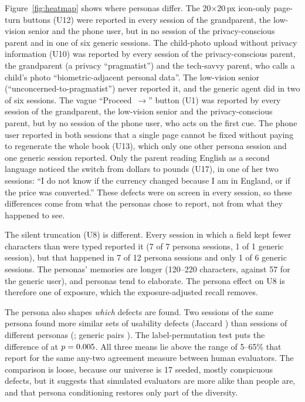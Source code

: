 \documentclass[10pt,twocolumn]{article}
\begin{document}
Figure~\ref{fig:heatmap} shows where personas differ. The 20$\times$20\,px icon-only page-turn buttons (U12) were reported in every session of the grandparent, the low-vision senior and the phone user, but in no session of the privacy-conscious parent and in one of six generic sessions. The child-photo upload without privacy information (U10) was reported by every session of the privacy-conscious parent, the grandparent (a privacy ``pragmatist'') and the tech-savvy parent, who calls a child's photo ``biometric-adjacent personal data''. The low-vision senior (``unconcerned-to-pragmatist'') never reported it, and the generic agent did in two of six sessions. The vague ``Proceed~$\to$'' button (U1) was reported by every session of the grandparent, the low-vision senior and the privacy-conscious parent, but by no session of the phone user, who acts on the first cue. The phone user reported in both sessions that a single page cannot be fixed without paying to regenerate the whole book (U13), which only one other persona session and one generic session reported. Only the parent reading English as a second language noticed the switch from dollars to pounds (U17), in one of her two sessions: ``I do not know if the currency changed because I am in England, or if the price was converted.'' These defects were on screen in every session, so these differences come from what the personas chose to report, not from what they happened to see.

The silent truncation (U8) is different. Every session in which a field kept fewer characters than were typed reported it (7 of 7 persona sessions, 1 of 1 generic session), but that happened in 7 of 12 persona sessions and only 1 of 6 generic sessions. The personas' memories are longer (120--220 characters, against 57 for the generic user), and personas tend to elaborate. The persona effect on U8 is therefore one of exposure, which the exposure-adjusted recall removes.

The persona also shapes \emph{which} defects are found. Two sessions of the same persona found more similar sets of usability defects (Jaccard \JacSame{}) than sessions of different personas (\JacCross{}; generic pairs \JacGeneric{}). The label-permutation test puts the difference of \LabelStat{} at $p = 0.005$. All three means lie above the range of 5--65\% that \citet{hertzum2001evaluator} report for the same any-two agreement measure between human evaluators. The comparison is loose, because our universe is 17 seeded, mostly conspicuous defects, but it suggests that simulated evaluators are more alike than people are, and that persona conditioning restores only part of the diversity.
\end{document}
